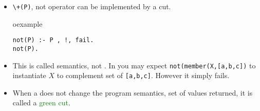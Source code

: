 \begin{frame}[fragile]
\begin{itemize}
\item \lstinline!\+(P)!, not operator can be implemented by a cut.\\
\begin{beamercolorbox}{oexample}
\begin{lstlisting}[escapeinside=`']
not(P) :- P , !, fail.
not(P).
\end{lstlisting}
\end{beamercolorbox}
\item This is called  semantics, not . In  you may expect \lstinline!not(member(X,[a,b,c])! to instantiate $X$ to complement set of \lstinline![a,b,c]!. However it simply fails.
\item When a  does not change the program semantics, set of values returned, it is called a \textcolor{green}{green cut}.
\end{itemize}
\end{frame}



